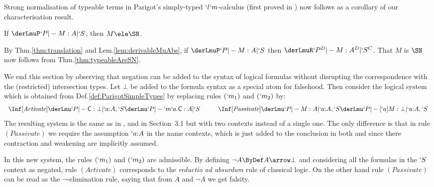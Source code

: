 \documentclass{lmcs}
\begin{document}
Strong normalisation of typeable terms in Parigot's simply-typed $`l`m$-calculus (first proved in \cite{Parigot'92}) now follows as a corollary of our characterisation result.

 \begin{cor} %
If $\derLmuP `P |- M:A | `S $, then $M \ele \SN$.
 \end{cor}

 \begin{Proof} By Thm.\skp\ref{thm:translation} and Lem.\skp\ref{lem:derivableMuAbs}, if $\derLmuP `P |- M : A | `S $ then $\derLmuR`P^D |- M : A^D | `S^C $. 
That $M$ is $\SN$ now follows from Thm.\skp\ref{thm:typeableAreSN}.
 \end{Proof}


We end this section by observing that negation can be added to the syntax of logical formulas without disrupting the correspondence with the (restricted) intersection types. Let $\bot$ be added to the formula syntax as a special atom for falsehood. Then consider the logical system which is obtained from Def.\skp\ref{def:ParigotSimpleTypes} by replacing rules $(`m_1)$ and $(`m_2)$ by:
%
 \[ \begin{array}{c@{\hspace{1cm}}c}
\Inf	[\textit{Activate}]
	{ \derLmu `P |- {\Cmd} : {\bot} | `a{:}A,`S
	}{ \derLmu `P |- {`m`a.\Cmd} : A | `S }
 & 
\Inf	[\textit{Passivate}]
	{\derLmu `P |- M : A | `a{:}A,`S
	}{ \derLmu `P |- [`a]M : {\bot} | `a{:}A,`S }
 \end{array} \]
The resulting system is the same as in \cite{Bierman'98}, and in \cite{Parigot00} Section~3.1 but with two contexts instead of a single one. 
The only difference is that in rule $(\textit{Passivate})$ we require the assumption $`a{:}A$ in the name contexts, which is just added to the conclusion in both \cite{Bierman'98} and \cite{Parigot00} since there contraction and weakening are implicitly assumed.

In this new system, the rules $(`m_1)$ and $(`m_2)$ are admissible. By defining $\neg A \ByDef A\arrow\bot$ and considering all the formulas in the $`S$ context as negated, rule $(\textit{Activate})$ corresponds to the \emph{reductio ad absurdum} rule of classical logic. On the other hand rule $(\textit{Passivate})$ can be read as the $\neg$-elimination rule, saying that from $A$ and $\neg A$ we get falsity.
\end{document}
